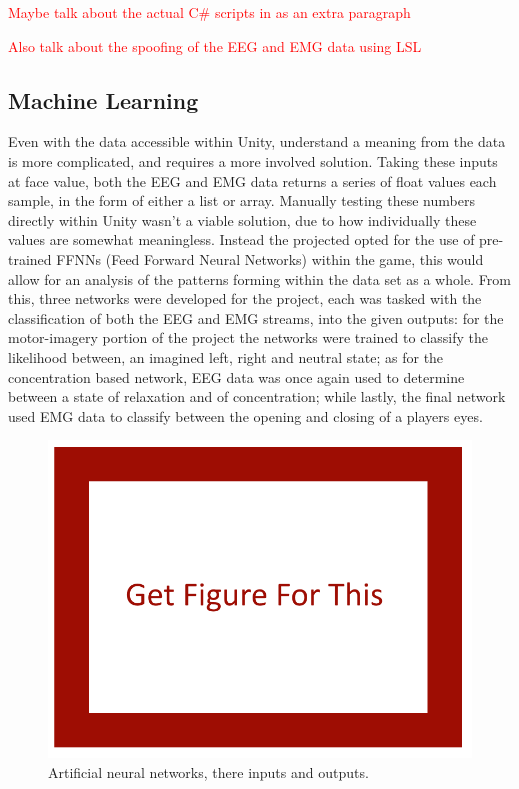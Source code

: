 \documentclass[11pt, a4paper]{article}
\newcommand{\commentintext}[1]
{\hfill 

\textcolor{red}{#1} 
	
\hfill
}
\begin{document}
\commentintext{Maybe talk about the actual C\# scripts in as an extra paragraph}
\commentintext{Also talk about the spoofing of the EEG and EMG data using LSL}




\pagebreak
\subsection{Machine Learning}	
Even with the data accessible within Unity, understand a meaning from the data is more complicated, and requires a more involved solution. Taking these inputs at face value, both the EEG and EMG data returns a series of float values each sample, in the form of either a list or array. Manually testing these numbers directly within Unity wasn't a viable solution, due to how individually these values are somewhat meaningless. Instead the projected opted for the use of pre-trained FFNNs (Feed Forward Neural Networks) within the game, this would allow for an analysis of the patterns forming within the data set as a whole. From this, three networks were developed for the project, each was tasked with the classification of both the EEG and EMG streams, into the given outputs: for the motor-imagery portion of the project the networks were trained to classify the likelihood between, an imagined left, right and neutral state; as for the concentration based network, EEG data was once again used to determine between a state of relaxation and of concentration; while lastly, the final network used EMG data to classify between the opening and closing of a players eyes.


\begin{figure}[H]
	\centering
	\includegraphics[width = 0.7 \linewidth] {[ Figures ]/Get Figure.png}
	\caption{Artificial neural networks, there inputs and outputs.}
	\label{fig:system_diagram_:_machine_learning}
\end{figure}
\end{document}
